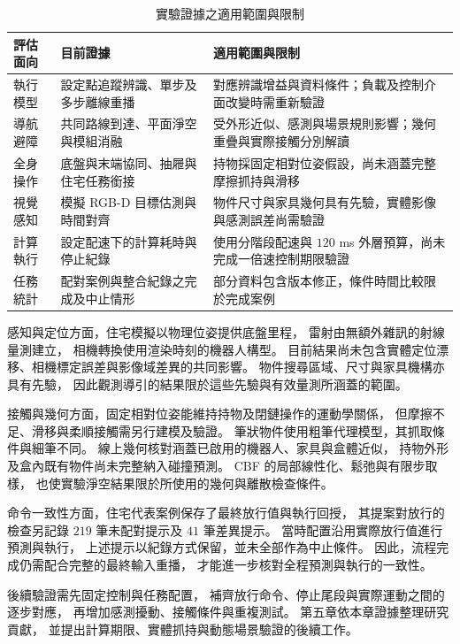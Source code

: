 \begin{table}[htbp]
    \centering
    \caption{實驗證據之適用範圍與限制}
    \label{tab:ch4_evidence_scope_limits}
    \begingroup
    \small
    \renewcommand{\arraystretch}{1.25}
    \begin{tabular}{p{} p{} p{}}
        \hline
        評估面向 & 目前證據 & 適用範圍與限制 \\
        \hline
        執行模型
        & 設定點追蹤辨識、單步及多步離線重播
        & 對應辨識增益與資料條件；負載及控制介面改變時需重新驗證 \\
        導航避障
        & 共同路線到達、平面淨空與模組消融
        & 受外形近似、感測與場景規則影響；幾何重疊與實際接觸分別解讀 \\
        全身操作
        & 底盤與末端協同、抽屜與住宅任務銜接
        & 持物採固定相對位姿假設，尚未涵蓋完整摩擦抓持與滑移 \\
        視覺感知
        & 模擬 RGB-D 目標估測與時間對齊
        & 物件尺寸與家具幾何具有先驗，實體影像與感測誤差尚需驗證 \\
        計算執行
        & 設定配速下的計算耗時與停止紀錄
        & 使用分階段配速與 $120$ ms 外層預算，尚未完成一倍速控制期限驗證 \\
        任務統計
        & 配對案例與整合紀錄之完成及中止情形
        & 部分資料包含版本修正，條件時間比較限於完成案例 \\
        \hline
    \end{tabular}
    \endgroup
\end{table}

感知與定位方面，住宅模擬以物理位姿提供底盤里程，
雷射由無額外雜訊的射線量測建立，
相機轉換使用渲染時刻的機器人構型。
目前結果尚未包含實體定位漂移、相機標定誤差與影像域差異的共同影響。
物件搜尋區域、尺寸與家具機構亦具有先驗，
因此觀測導引的結果限於這些先驗與有效量測所涵蓋的範圍。

接觸與幾何方面，固定相對位姿能維持持物及閉鏈操作的運動學關係，
但摩擦不足、滑移與柔順接觸需另行建模及驗證。
筆狀物件使用粗筆代理模型，其抓取條件與細筆不同。
線上幾何核對涵蓋已啟用的機器人、家具與盒體近似，
持物外形及盒內既有物件尚未完整納入碰撞預測。
CBF 的局部線性化、鬆弛與有限步取樣，
也使實驗淨空結果限於所使用的幾何與離散檢查條件。

命令一致性方面，住宅代表案例保存了最終放行值與執行回授，
其提案對放行的檢查另記錄 $219$ 筆未配對提示及 $41$ 筆差異提示。
當時配置沿用實際放行值進行預測與執行，
上述提示以紀錄方式保留，並未全部作為中止條件。
因此，流程完成仍需配合完整的最終輸入重播，
才能進一步核對全程預測與執行的一致性。

後續驗證需先固定控制與任務配置，
補齊放行命令、停止尾段與實際運動之間的逐步對應，
再增加感測擾動、接觸條件與重複測試。
第五章依本章證據整理研究貢獻，
並提出計算期限、實體抓持與動態場景驗證的後續工作。
